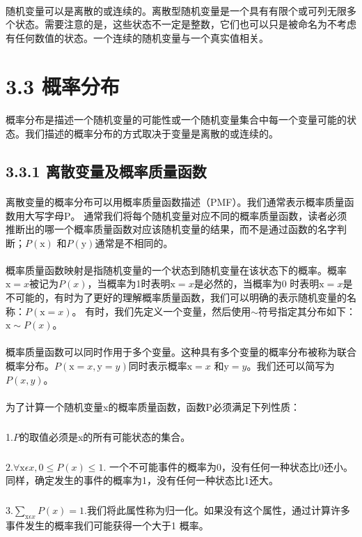 \documentclass{article}
\begin{document}
    \paragraph{}
    随机变量可以是离散的或连续的。离散型随机变量是一个具有有限个或可列无限多个状态。需要注意的是，这些状态不一定是整数，它们也可以只是被命名为不考虑有任何数值的状态。一个连续的随机变量与一个真实值相关。


   \section*{3.3 概率分布}
    \paragraph{}
    概率分布是描述一个随机变量的可能性或一个随机变量集合中每一个变量可能的状态。我们描述的概率分布的方式取决于变量是离散的或连续的。
    \subsection*{3.3.1 离散变量及概率质量函数}
    \paragraph{}
    离散变量的概率分布可以用概率质量函数描述（PMF）。我们通常表示概率质量函数用大写字母P。 通常我们将每个随机变量对应不同的概率质量函数，读者必须推断出的哪一个概率质量函数对应该随机变量的结果，而不是通过函数的名字判断；$P(\mathrm{x})$ 和$P(\mathrm{y})$通常是不相同的。
    \paragraph{}
    概率质量函数映射是指随机变量的一个状态到随机变量在该状态下的概率。概率$\mathrm{x} = x$被记为$P(x)$，当概率为1时表明$\mathrm{x} = x$是必然的，当概率为0 时表明$\mathrm{x}=x$是不可能的，有时为了更好的理解概率质量函数，我们可以明确的表示随机变量的名称：$P(\mathrm{x} = x)$。 有时，我们先定义一个变量，然后使用$\sim$符号指定其分布如下：$\mathrm{x}\sim{P(x)}$。
    \paragraph{}
    概率质量函数可以同时作用于多个变量。这种具有多个变量的概率分布被称为联合概率分布。$P(\mathrm{x} = x, \mathrm{y} = y)$同时表示概率$\mathrm{x} = x$ 和$\mathrm{y} = y$。我们还可以简写为$P(x, y)$。
    \paragraph{}
    为了计算一个随机变量x的概率质量函数，函数P必须满足下列性质：
    \subparagraph{}
     1.$P$的取值必须是x的所有可能状态的集合。
    \subparagraph{}
     $2.\forall\mathrm{x} \epsilon x,0 \leq P(x) \leq 1.$ 一个不可能事件的概率为0，没有任何一种状态比0还小。同样，确定发生的事件的概率为1，没有任何一种状态比1还大。
    \subparagraph{}
     $3.\sum _{\mathrm{x} \epsilon x} P(x) = 1.$我们将此属性称为归一化。如果没有这个属性，通过计算许多事件发生的概率我们可能获得一个大于1 概率。
\end{document}
